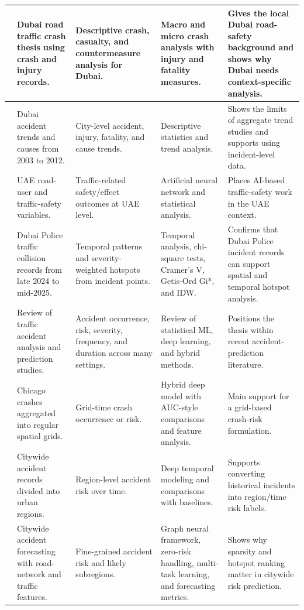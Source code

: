 \begin{longtable}{|p{0.8cm}|p{2.4cm}|p{3.0cm}|p{3.2cm}|p{3.9cm}|}
\cite{aldah2010dubai} & Dubai road traffic crash thesis using crash and injury records. & Descriptive crash, casualty, and countermeasure analysis for Dubai. & Macro and micro crash analysis with injury and fatality measures. & Gives the local Dubai road-safety background and shows why Dubai needs context-specific analysis. \\ \hline
\cite{abdelfatah2015dubai} & Dubai accident trends and causes from 2003 to 2012. & City-level accident, injury, fatality, and cause trends. & Descriptive statistics and trend analysis. & Shows the limits of aggregate trend studies and supports using incident-level data. \\ \hline
\cite{abuzaid2024uae} & UAE road-user and traffic-safety variables. & Traffic-related safety/effect outcomes at UAE level. & Artificial neural network and statistical analysis. & Places AI-based traffic-safety work in the UAE context. \\ \hline
\cite{alsaleh2026dubaihotspots} & Dubai Police traffic collision records from late 2024 to mid-2025. & Temporal patterns and severity-weighted hotspots from incident points. & Temporal analysis, chi-square tests, Cramer's V, Getis-Ord Gi*, and IDW. & Confirms that Dubai Police incident records can support spatial and temporal hotspot analysis. \\ \hline
\cite{behboudi2024review} & Review of traffic accident analysis and prediction studies. & Accident occurrence, risk, severity, frequency, and duration across many settings. & Review of statistical ML, deep learning, and hybrid methods. & Positions the thesis within recent accident-prediction literature. \\ \hline
\cite{kashifi2022grid} & Chicago crashes aggregated into regular spatial grids. & Grid-time crash occurrence or risk. & Hybrid deep model with AUC-style comparisons and feature analysis. & Main support for a grid-based crash-risk formulation. \\ \hline
\cite{ren2017citywide} & Citywide accident records divided into urban regions. & Region-level accident risk over time. & Deep temporal modeling and comparisons with baselines. & Supports converting historical incidents into region/time risk labels. \\ \hline
\cite{zhou2020riskoracle} & Citywide accident forecasting with road-network and traffic features. & Fine-grained accident risk and likely subregions. & Graph neural framework, zero-risk handling, multi-task learning, and forecasting metrics. & Shows why sparsity and hotspot ranking matter in citywide risk prediction. \\ \hline

\end{longtable}
